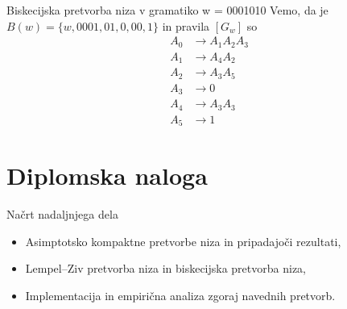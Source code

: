 \documentclass{beamer}
\theoremstyle{definition} %
\begin{document}
\begin{frame}
    \begin{exampleblock}{Biskecijska pretvorba niza v gramatiko w = 0001010}
        Vemo, da je $ B(w) = \{ w, 0001, 01, 0, 00, 1 \} $
        in pravila $ [G_{w}] $ so
        \begin{align*}
            A_0 &\rightarrow A_1 A_2 A_3 \tag{1} \\
            A_1 &\rightarrow A_4 A_2 \tag{2}\\
            A_2 &\rightarrow A_3 A_5 \tag{4}\\
            A_3 &\rightarrow 0 \tag{5} \\
            A_4 &\rightarrow A_3 A_3 \tag{3} \\
            A_5 &\rightarrow 1 \tag{6}
        \end{align*}
    \end{exampleblock}
\end{frame}

\section{Diplomska naloga}

\begin{frame}{Načrt nadaljnjega dela}
    \begin{itemize}
        \item Asimptotsko kompaktne pretvorbe niza in pripadajoči rezultati,
        \item Lempel–Ziv pretvorba niza in biskecijska pretvorba niza,
        \item Implementacija in empirična analiza zgoraj navednih pretvorb.
    \end{itemize}
\end{frame}
\end{document}
